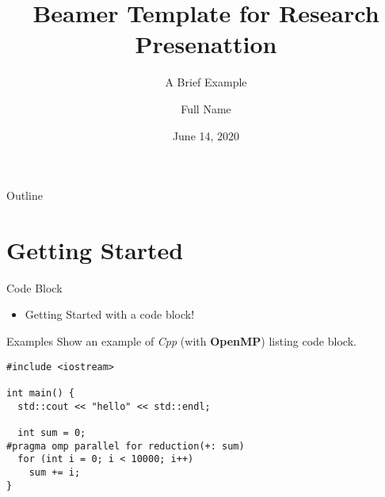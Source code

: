 \documentclass[aspectratio=169]{beamer}
\title[Beamer Template]{Beamer Template for Research Presenattion}
\subtitle{A Brief Example}
\author[Short Name]{Full Name}
\institute{Where are you from?}
\date{June 14, 2020}
\begin{document}
\begingroup
\makeatletter
\setlength{\hoffset}{-.5\beamer@sidebarwidth}
\makeatother
\begin{frame}[plain]
     \titlepage
\end{frame}
\endgroup

\begin{frame}{Outline}
  \tableofcontents
\end{frame}

\section{Getting Started}

\begin{frame}[fragile]{Code Block}

\begin{itemize}
  \item Getting Started with a code block!
\end{itemize}

\vskip 0.5cm

\begin{exampleblock}{Examples}
  Show an example of \emph{Cpp} (with \textbf{OpenMP}) listing code block.
  \begin{lstlisting}[firstnumber=1, label=glabels, xleftmargin=10pt] 
#include <iostream>

int main() {
  std::cout << "hello" << std::endl;

  int sum = 0;
#pragma omp parallel for reduction(+: sum)
  for (int i = 0; i < 10000; i++)
    sum += i;
}
  \end{lstlisting}
\end{exampleblock}

\end{frame}
\end{document}
